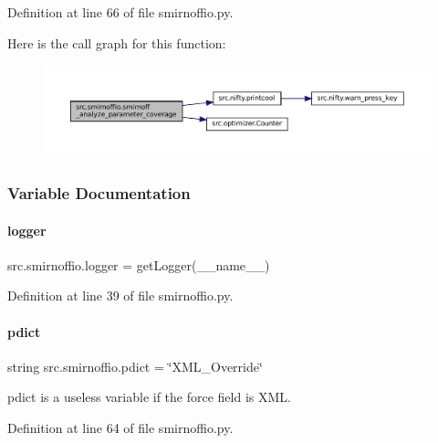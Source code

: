 Definition at line 66 of file smirnoffio.\+py.

Here is the call graph for this function\+:
\nopagebreak
\begin{figure}[H]
\begin{center}
\leavevmode
\includegraphics[width=350pt]{namespacesrc_1_1smirnoffio_a993b4343db1c9de5ef6358de38bc6493_cgraph}
\end{center}
\end{figure}


\subsubsection{Variable Documentation}
\mbox{\label{namespacesrc_1_1smirnoffio_a1515611165a2fddb1dd339b81aa5ce66}} 
\paragraph{\texorpdfstring{logger}{logger}}
{\footnotesize\ttfamily src.\+smirnoffio.\+logger = get\+Logger(\+\_\+\+\_\+name\+\_\+\+\_\+)}



Definition at line 39 of file smirnoffio.\+py.

\mbox{\label{namespacesrc_1_1smirnoffio_a505ffb180d62c1a425d1a1feadc4e290}} 
\paragraph{\texorpdfstring{pdict}{pdict}}
{\footnotesize\ttfamily string src.\+smirnoffio.\+pdict = \char`\"{}X\+M\+L\+\_\+\+Override\char`\"{}}



pdict is a useless variable if the force field is X\+ML. 



Definition at line 64 of file smirnoffio.\+py.

